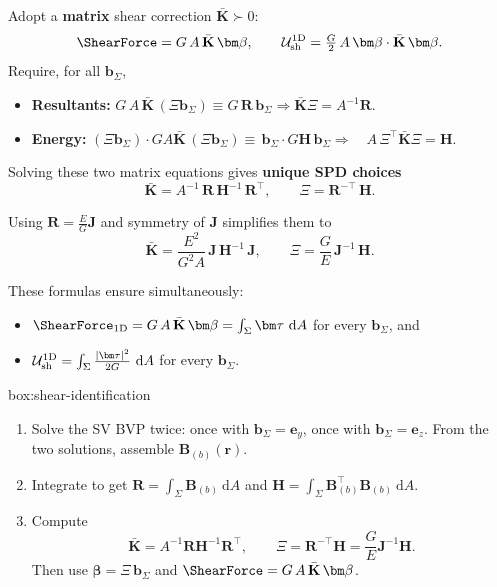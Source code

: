\begin{Quote}

Adopt a \textbf{matrix} shear correction \(\bar{\mathbf{K}}\succ0\): \[
\ShearForce  =  G\,A\,\bar{\mathbf{K}}\,\bm\beta,
\qquad
\mathcal U_{\rm sh}^{1\text{D}}  =  \tfrac{G}{2}\,A\,\bm\beta\cdot\bar{\mathbf{K}}\,\bm\beta.
\]
Require, for all \(\bm b_{\Sigma}\),
\begin{itemize}
\item
  \textbf{Resultants:}
  \(G\,A\,\bar{\mathbf{K}}\,(\Xi\bm b_{\Sigma}) \equiv G\,\mathbf R\,\bm b_{\Sigma}
  \Rightarrow \bar{\mathbf{K}} \Xi = A^{-1}\mathbf R.\)
\item
  \textbf{Energy:}
  \((\Xi\bm b_{\Sigma})\cdot GA\bar{\mathbf{K}}\,(\Xi\bm b_{\Sigma})
  \equiv \,\bm b_{\Sigma}\cdot G\mathbf H\,\bm b_{\Sigma}
  \Rightarrow\quad A\,\Xi^{\!\top}\bar{\mathbf{K}} \Xi=\mathbf H.\)
\end{itemize}

Solving these two matrix equations gives \textbf{unique SPD choices} \[
\bar{\mathbf{K}}  =  A^{-1}\,\mathbf R\,\mathbf H^{-1}\,\mathbf R^{\!\top},
\qquad
\Xi  =  \mathbf R^{-\!\top}\,\mathbf H.
\]

Using \(\mathbf R=\tfrac{E}{G}\mathbf{J}\) and symmetry of \(\mathbf{J}\)
simplifies them to 
\[
\bar{\mathbf{K}}  =  \frac{E^{2}}{G^{2}A}\,\mathbf{J}\,\mathbf H^{-1}\,\mathbf{J},
\qquad
\Xi  =  \frac{G}{E}\,\mathbf{J}^{-1}\,\mathbf H.
\]

These formulas ensure simultaneously:

\begin{itemize}
\tightlist
\item
  \(\ShearForce_{\rm 1D} = G\,A\,\bar{\mathbf{K}}\,\bm\beta = \int_{\Sigma}\bm\tau\mathrm{~d}A\)
  for every \(\bm b_{\Sigma}\), and
\item
  \(\mathcal U_{\rm sh}^{1\text{D}} = \int_{\Sigma}\tfrac{|\bm\tau|^{2}}{2G}\mathrm{~d}A\)
  for every \(\bm b_{\Sigma}\).
\end{itemize}
\end{Quote}

\begin{ambox}[Procedure]{box:shear-identification}

\begin{enumerate}
\def\labelenumi{\arabic{enumi}.}
\tightlist
\item
  Solve the SV BVP twice: once with \(\bm b_{\Sigma}=\mathbf e_y\), once
  with \(\bm b_{\Sigma}=\mathbf e_z\). 
  From the two solutions, assemble
  \(\mathbf{B}_{(b)}(\bm{r})\).
\item
  Integrate to get \(\mathbf R=\int_{\Sigma}\mathbf{B}_{(b)}\mathrm{~d}A\)
  and
  \(\mathbf H=\int_{\Sigma}\mathbf{B}_{(b)}^{\!\top}\mathbf{B}_{(b)}\mathrm{~d}A\).
\item
  Compute \[
  \bar{\mathbf{K}}=A^{-1}\mathbf R\mathbf H^{-1}\mathbf R^{\!\top},\qquad
  \Xi=\mathbf R^{-\!\top}\mathbf H=\frac{G}{E}\mathbf{J}^{-1}\mathbf H.
  \] Then use \(\bm\beta=\Xi\,\bm b_{\Sigma}\) and
  \(\ShearForce =G\,A\,\bar{\mathbf{K}}\,\bm\beta\).
\end{enumerate}
\end{ambox}


